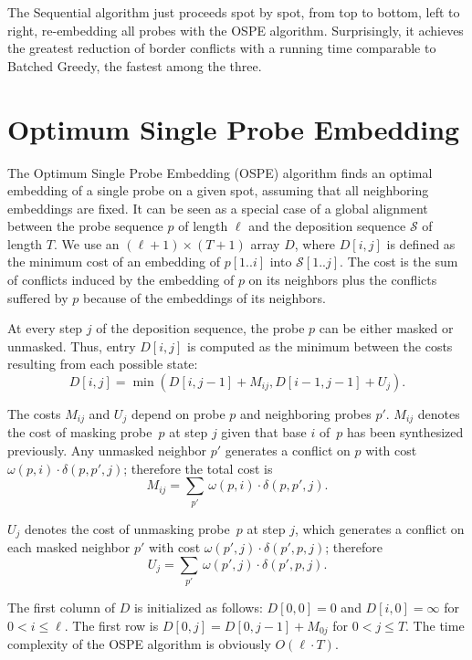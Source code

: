 \documentclass{llncs}
\begin{document}
The Sequential algorithm just proceeds spot by spot, from top to
bottom, left to right, re-embedding all probes with the OSPE algorithm.
Surprisingly, it achieves the greatest reduction of border conflicts with a
running time comparable to Batched Greedy, the fastest among the three.


\section{Optimum Single Probe Embedding}
\label{sec:ospe}

The Optimum Single Probe Embedding (OSPE) algorithm finds an optimal
embedding of a single probe on a given spot, assuming that all neighboring
embeddings are fixed. It can be seen as a special case of a global alignment
between the probe sequence $p$ of length $\ell$ and the deposition sequence
$\mathcal{S}$ of length $T$. We use an $(\ell + 1) \times (T + 1)$ array
$D$, where $D[i,j]$ is defined as the minimum cost of an embedding of
$p[1..i]$ into $\mathcal{S}[1..j]$.  The cost is the sum of conflicts induced
by the embedding of $p$ on its neighbors plus the conflicts suffered by $p$
because of the embeddings of its neighbors.

At every step $j$ of the deposition sequence, the probe $p$ can be either
masked or unmasked. Thus, entry $D[i,j]$ is computed as the minimum between
the costs resulting from each possible state:
\[
D[i,j] = \min (D[i,j-1] + M_{ij}, D[i-1,j-1] + U_{j}).
\]

The costs $M_{ij}$ and $U_{j}$ depend on probe $p$ and neighboring probes $p'$.
$M_{ij}$ denotes the cost of masking probe~$p$ at step $j$ given that base $i$
of~$p$ has been synthesized previously. Any unmasked neighbor $p'$
generates a conflict on $p$ with cost $\omega(p,i)\cdot \delta(p,p',j)$;
therefore the total cost is
\[ M_{ij} = \sum_{p'}\, \omega(p,i) \cdot \delta(p,p',j). \]

$U_{j}$ denotes the cost of unmasking probe~$p$ at step $j$, which generates a
conflict on each masked neighbor $p'$ with cost $\omega(p',j)\cdot
\delta(p',p,j)$; therefore 
\[ U_j = \sum_{p'}\, \omega(p',j) \cdot \delta(p',p,j). \]

The first column of $D$ is initialized as follows: $D[0,0] = 0$ and $D[i,0] =
\infty$ for $0 < i \leq \ell$. The first row is $D[0,j] = D[0,j-1]+M_{0j}$ for
$0<j\leq T$.
The time complexity of the OSPE algorithm is obviously $O(\ell \cdot T)$.
\end{document}
